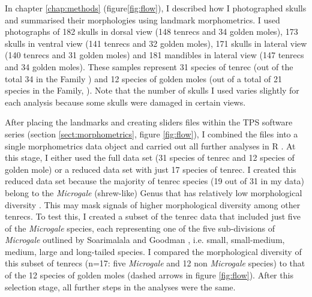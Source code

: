 	In chapter \ref{chap:methods} (figure\ref{fig:flow}), I described how I photographed skulls and summarised their morphologies using landmark morphometrics. I used photographs of 182 skulls in dorsal view (148 tenrecs and 34 golden moles), 173 skulls in ventral view (141 tenrecs and 32 golden moles), 171 skulls in lateral view (140 tenrecs and 31 golden moles) and 181 mandibles in lateral view (147 tenrecs and 34 golden moles). These samples represent 31 species of tenrec (out of the total 34 in the Family \citep{Olson2013}) and 12 species of golden moles (out of a total of 21 species in the Family, \citep{Asher2010}). Note that the number of skulls I used varies slightly for each analysis because some skulls were damaged in certain views.
	
	

	After placing the landmarks and creating sliders files within the TPS software series (section \ref{sect:morphometrics}, figure \ref{fig:flow}), I combined the files into a single morphometrics data object and carried out all further analyses in R \citep{Team2014}. At this stage, I either used the full data set (31 species of tenrec and 12 species of golden mole) or a reduced data set with just 17 species of tenrec. I created this reduced data set because the majority of tenrec species (19 out of 31 in my data) belong to the \textit{Microgale} (shrew-like) Genus that has relatively low morphological diversity \citep{Soarimalala2011, Jenkins2003}. This may mask signals of higher morphological diversity among other tenrecs. To test this, I created a subset of the tenrec data that included just five of the \textit{Microgale} species, each representing one of the five sub-divisions of \textit{Microgale} outlined by Soarimalala and Goodman \citeyearpar{Soarimalala2011}, i.e. small, small-medium, medium, large and long-tailed species. I compared the morphological diversity of this subset of tenrecs (n=17: five \textit{Microgale} and 12 non \textit{Microgale} species) to that of the 12 species of golden moles (dashed arrows in figure \ref{fig:flow}). After this selection stage, all further steps in the analyses were the same.
	
		
